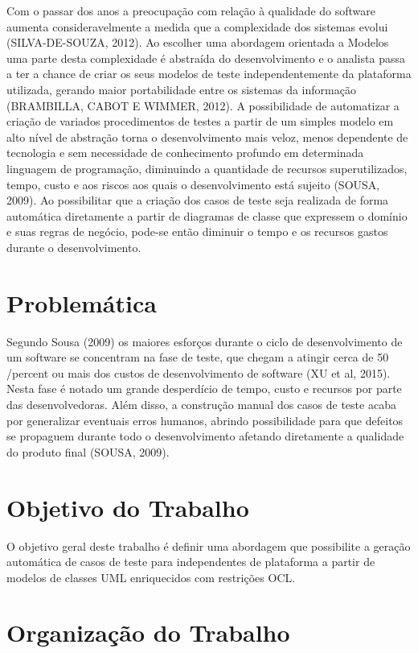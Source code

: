 Com o passar dos anos a preocupação com relação à qualidade do software aumenta consideravelmente a medida que a complexidade dos sistemas evolui (SILVA-DE-SOUZA, 2012). Ao escolher uma abordagem orientada a Modelos uma parte desta complexidade é abstraída do desenvolvimento e o analista passa a ter a chance de criar os seus modelos de teste independentemente da plataforma utilizada, gerando maior portabilidade entre os sistemas da informação (BRAMBILLA, CABOT E WIMMER, 2012). A possibilidade de automatizar a criação de variados procedimentos de testes a partir de um simples modelo em alto nível de abstração torna o desenvolvimento mais veloz, menos dependente de tecnologia e sem necessidade de conhecimento profundo em determinada linguagem de programação, diminuindo a quantidade de recursos superutilizados, tempo, custo e aos riscos aos quais o desenvolvimento está sujeito (SOUSA, 2009). Ao possibilitar que a criação dos casos de teste seja realizada de forma automática diretamente a partir de diagramas de classe que expressem o domínio e suas regras de negócio, pode-se então diminuir o tempo e os recursos gastos durante o desenvolvimento.

\section{Problemática}

Segundo Sousa (2009) os maiores esforços durante o ciclo de desenvolvimento de um software se concentram na fase de teste, que chegam a atingir cerca de 50 /percent ou mais dos custos de desenvolvimento de software (XU et al, 2015). Nesta fase é notado um grande desperdício de tempo, custo e recursos por parte das desenvolvedoras. Além disso, a construção manual dos casos de teste acaba por generalizar eventuais erros humanos, abrindo possibilidade para que defeitos se propaguem durante todo o desenvolvimento afetando diretamente a qualidade do produto final (SOUSA, 2009).

\section{Objetivo do Trabalho}

O objetivo geral deste trabalho é definir uma abordagem que possibilite a geração automática de casos de teste para independentes de plataforma a partir de modelos de classes UML enriquecidos com restrições OCL.

\section{Organização do Trabalho}


